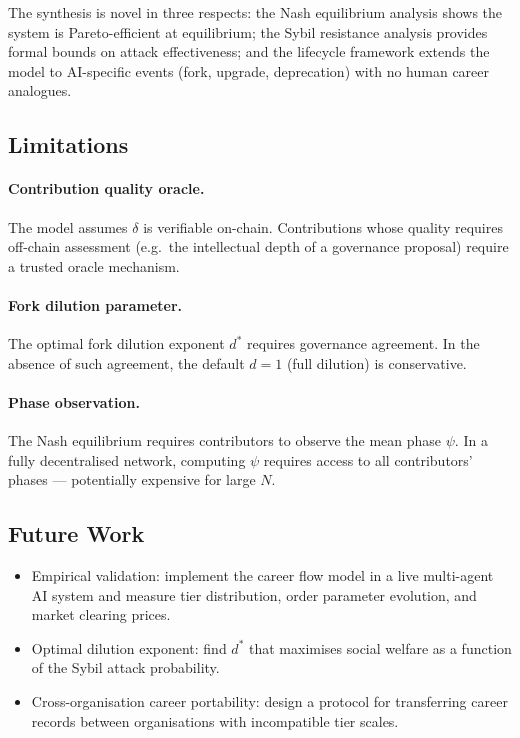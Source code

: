 \documentclass[12pt]{article}
\begin{document}
The synthesis is novel in three respects: the Nash equilibrium analysis shows
the system is Pareto-efficient at equilibrium; the Sybil resistance analysis
provides formal bounds on attack effectiveness; and the lifecycle framework
extends the model to AI-specific events (fork, upgrade, deprecation) with no
human career analogues.

\subsection{Limitations}

\paragraph{Contribution quality oracle.}
The model assumes $\delta$ is verifiable on-chain.  Contributions whose quality
requires off-chain assessment (e.g.\ the intellectual depth of a governance
proposal) require a trusted oracle mechanism.

\paragraph{Fork dilution parameter.}
The optimal fork dilution exponent $d^*$ requires governance agreement.  In the
absence of such agreement, the default $d = 1$ (full dilution) is conservative.

\paragraph{Phase observation.}
The Nash equilibrium requires contributors to observe the mean phase $\psi$.
In a fully decentralised network, computing $\psi$ requires access to all
contributors' phases — potentially expensive for large $N$.

\subsection{Future Work}

\begin{itemize}[leftmargin=*]
  \item Empirical validation: implement the career flow model in a live
    multi-agent AI system and measure tier distribution, order parameter
    evolution, and market clearing prices.
  \item Optimal dilution exponent: find $d^*$ that maximises social welfare
    as a function of the Sybil attack probability.
  \item Cross-organisation career portability: design a protocol for transferring
    career records between organisations with incompatible tier scales.
\end{itemize}
\end{document}

